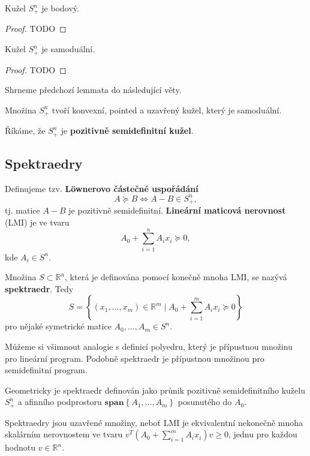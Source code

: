 \begin{lm2}
    Kužel $S_+^n$ je bodový.
\end{lm2}

\begin{proof}
    TODO
\end{proof}

\begin{lm2}
    Kužel $S_+^n$ je samoduální.
\end{lm2}

\begin{proof}
    TODO
\end{proof}

\noindent Shrneme předchozí lemmata do následující věty.

\begin{vt2}
    Množina $S_+^n$ tvoří konvexní, pointed a uzavřený kužel, který je samoduální.
\end{vt2}

Říkáme, že $S_+^n$ je \textbf{pozitivně semidefinitní kužel}.

\subsection*{Spektraedry}

Definujeme tzv. \textbf{L\"{o}wnerovo částečné uspořádání}
$$
    A \succeq B \iff A - B \in S_+^n,
$$
tj. matice $A - B$ je pozitivně semidefinitní. \textbf{Lineární maticová nerovnost} (LMI) je ve tvaru
$$
    A_0 + \sum_{i=1}^n A_i x_i \succeq 0,
$$
kde $A_i \in S^n$.

Množina $S \subset \mathbb{R}^n$, která je definována pomocí konečně mnoha LMI, se nazývá \textbf{spektraedr}. Tedy
$$
    S = \left\{ (x_1, \dots, x_m) \in \mathbb{R}^m \mid A_0 + \sum_{i=1}^m A_i x_i \succeq 0 \right\}
$$
pro nějaké symetrické matice $A_0, \dots, A_m \in S^n$.

Můžeme si všimnout analogie s definicí polyedru, který je přípustnou množinu pro lineární program. Podobně spektraedr je přípustnou množinou pro semidefinitní program.

Geometricky je spektraedr definován jako průnik pozitivně semidefinitního kuželu $S_+^n$ a afinního podprostoru $\textbf{span}\left\{ A_1, \dots, A_m \right\}$ posunutého do $A_0$.

Spektraedry jsou uzavřené množiny, neboť LMI je ekvivalentní nekonečně mnoha skalárním nerovnostem ve tvaru $v^T(A_0 + \sum_{i=1}^m A_ix_i)v \geq 0$, jednu pro každou hodnotu $v \in \mathbb{R}^n$.

